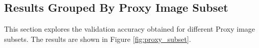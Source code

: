 \subsection{Results Grouped By Proxy Image Subset}
This section explores the validation accuracy obtained for different Proxy image subsets. The results are shown in Figure \ref{fig:proxy_subset}.



